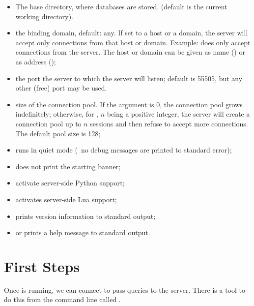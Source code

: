 \begin{itemize}
\item {} The base directory,
where databases are stored.
(default is the current working directory).

\item {} the binding domain, default:
any. If set to a host or a domain, the server
will accept only connections from that host
or domain. Example:  does
only accept connections from the server.
The host or domain can be given as name ()
or as  address ();

\item {} the port the server to which
the server will listen; default is 55505,
but any other (free) port may be used.
 
\item {} size of the connection pool.
If the argument is 0, the connection pool grows
indefinitely; otherwise, for ,
$n$ being a positive integer,
the server will create a connection pool
up to $n$ sessions and then refuse to accept
more connections. The default pool size is 128;

\item {} runs in quiet mode
(\ie\ no debug messages are printed to standard error);
\item {} does not print the starting banner;
\item {} activate server-side Python support;
\item {} activates server-side Lua support;
\item {} prints version information to standard output;
\item {} or  prints a help message to standard output.
\end{itemize}

\section{First Steps}
Once  is running, we can connect to pass
queries to the server. There is a tool to do this from the command line
called .


